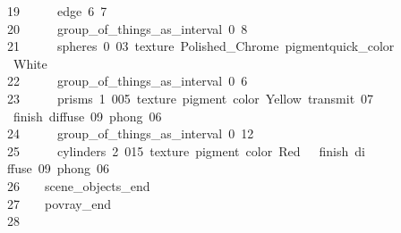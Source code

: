 \begin{tabbing}
19\>\ \ \ \ \ \ edge\ 6\ 7\ \\[0pt]
20\>\ \ \ \ \ \ group\_of\_things\_as\_interval\ 0\ 8\ \\[0pt]
21\>\ \ \ \ \ \ spheres\ 0\ 03\ texture\ Polished\_Chrome\ pigmentquick\_color\\[0pt]
\>\ White\ \ \\[0pt]
22\>\ \ \ \ \ \ group\_of\_things\_as\_interval\ 0\ 6\ \\[0pt]
23\>\ \ \ \ \ \ prisms\ 1\ 005\ texture\ pigment\ color\ Yellow\ transmit\ 07\ \\[0pt]
\>\ finish\ diffuse\ 09\ phong\ 06\ \ \\[0pt]
24\>\ \ \ \ \ \ group\_of\_things\_as\_interval\ 0\ 12\ \\[0pt]
25\>\ \ \ \ \ \ cylinders\ 2\ 015\ texture\ pigment\ color\ Red\ \ \ finish\ di\\[0pt]
\>ffuse\ 09\ phong\ 06\ \ \\[0pt]
26\>\ \ \ \ scene\_objects\_end\ \\[0pt]
27\>\ \ \ \ povray\_end\\[0pt]
28\>\end{tabbing}
